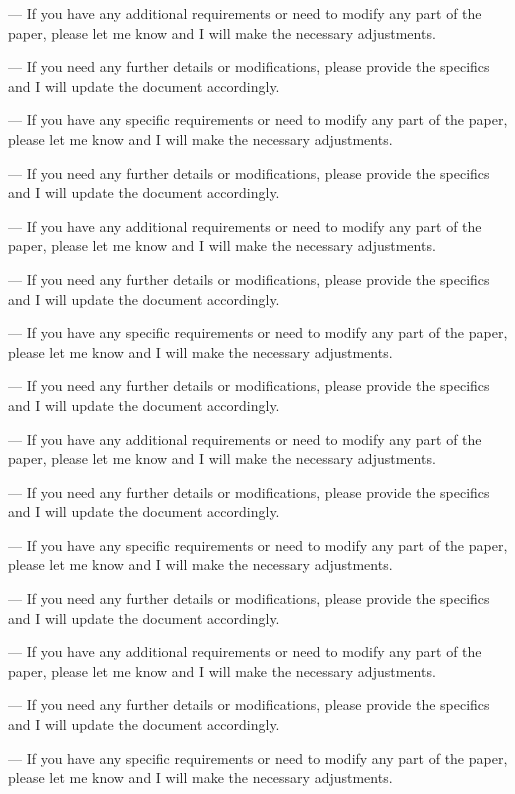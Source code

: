 --- 
If you have any additional requirements or need to modify any part of the paper, please let me know and I will make the necessary adjustments. 

--- 
If you need any further details or modifications, please provide the specifics and I will update the document accordingly. 

--- 
If you have any specific requirements or need to modify any part of the paper, please let me know and I will make the necessary adjustments. 

--- 
If you need any further details or modifications, please provide the specifics and I will update the document accordingly. 

--- 
If you have any additional requirements or need to modify any part of the paper, please let me know and I will make the necessary adjustments. 

--- 
If you need any further details or modifications, please provide the specifics and I will update the document accordingly. 

--- 
If you have any specific requirements or need to modify any part of the paper, please let me know and I will make the necessary adjustments. 

--- 
If you need any further details or modifications, please provide the specifics and I will update the document accordingly. 

--- 
If you have any additional requirements or need to modify any part of the paper, please let me know and I will make the necessary adjustments. 

--- 
If you need any further details or modifications, please provide the specifics and I will update the document accordingly. 

--- 
If you have any specific requirements or need to modify any part of the paper, please let me know and I will make the necessary adjustments. 

--- 
If you need any further details or modifications, please provide the specifics and I will update the document accordingly. 

--- 
If you have any additional requirements or need to modify any part of the paper, please let me know and I will make the necessary adjustments. 

--- 
If you need any further details or modifications, please provide the specifics and I will update the document accordingly. 

--- 
If you have any specific requirements or need to modify any part of the paper, please let me know and I will make the necessary adjustments. 


